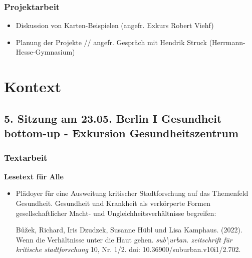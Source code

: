 \documentclass[
  ngerman,
]{article}
\providecommand{\tightlist}{%
  \setlength{\itemsep}{0pt}\setlength{\parskip}{0pt}}
\begin{document}
\hypertarget{projektarbeit-2}{%
\subsubsection*{Projektarbeit}\label{projektarbeit-2}}

\begin{itemize}
\tightlist
\item
  Diskussion von Karten-Beispielen (angefr. Exkurs Robert Viehf)
\item
  Planung der Projekte // angefr. Gespräch mit Hendrik Struck (Herrmann-Hesse-Gymnasium)
\end{itemize}

\hypertarget{kontext}{%
\section*{Kontext}\label{kontext}}

\hypertarget{sitzung-am-23.05.-berlin-i-gesundheit-bottom-up---exkursion-gesundheitszentrum}{%
\subsection*{5. Sitzung am 23.05. \textbar{} Berlin I Gesundheit bottom-up - Exkursion Gesundheitszentrum}\label{sitzung-am-23.05.-berlin-i-gesundheit-bottom-up---exkursion-gesundheitszentrum}}

\hypertarget{textarbeit-4}{%
\subsubsection*{Textarbeit}\label{textarbeit-4}}

\textbf{Lesetext für Alle}

\begin{itemize}
\item
  Plädoyer für eine Ausweitung kritischer Stadtforschung auf das Themenfeld Gesundheit. Gesundheit und Krankheit als verkörperte Formen gesellschaftlicher Macht- und Ungleichheitsverhältnisse begreifen:

  Bůžek, Richard, Iris Dzudzek, Susanne Hübl und Lisa Kamphaus. (2022). Wenn die Verhältnisse unter die Haut gehen. \emph{sub\textbackslash urban. zeitschrift für kritische stadtforschung} 10, Nr. 1/2. doi: 10.36900/suburban.v10i1/2.702.
\end{itemize}
\end{document}
